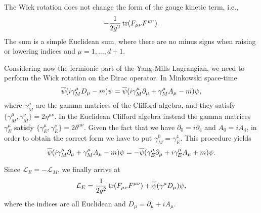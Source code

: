 %
The Wick rotation does not change the form of the gauge kinetic term, i.e.,
\begin{equation}
    - \frac{1}{2 g^2} \tr(F_{\mu \nu} F^{\mu \nu}).
\end{equation}
The sum is a simple Euclidean sum, where there are no minus signs when raising or lowering indices and $\mu = 1, \dots, d+1$.

Considering now the fermionic part of the Yang-Mills Lagrangian, we need to perform the Wick rotation on the Dirac operator.
In Minkowski space-time
\begin{equation}
    \overline{\psi} \qty( i \gamma^{\mu}_M D_{\mu} - m ) \psi
    = \overline{\psi} \qty( i \gamma^{\mu}_M \partial_{\mu} + \gamma^{\mu}_M A_{\mu} - m ) \psi,
\end{equation}
where $\gamma^{\mu}_M$ are the gamma matrices of the Clifford algebra, and they satisfy $\{\gamma^{\mu}_M, \gamma^{\nu}_M\} = 2 \eta^{\mu \nu}$.
In the Euclidean Clifford algebra instead the gamma matrices $\gamma^{\mu}_E$ satisfy $\{\gamma^{\mu}_E, \gamma^{\nu}_E\} = 2 \delta^{\mu \nu}$.
Given the fact that we have $\partial_0 = i \partial_4$ and $A_0 = i A_4$, in order to obtain the correct form we have to put $\gamma^0_M = \gamma^4_E$.
This procedure yields
\begin{equation}
    \overline{\psi} \qty( i \gamma^{\mu}_M \partial_{\mu} + \gamma^{\mu}_M A_{\mu} - m ) \psi
    =
    - \overline{\psi} \qty( \gamma^{\mu}_E \partial_{\mu} + i\gamma^{\mu}_E A_{\mu} + m ) \psi.
\end{equation}

Since $\mathcal{L}_E = - \mathcal{L}_M$, we finally arrive at
\begin{equation}
    \mathcal{L}_E
    = \frac{1}{2 g^2} \tr (F_{\mu \nu} F^{\mu \nu}) + \overline{\psi} \qty( \gamma^{\mu} D_{\mu} ) \psi,
\end{equation}
where the indices are all Euclidean and $D_{\mu} = \partial_{\mu} + i A_{\mu}$.



